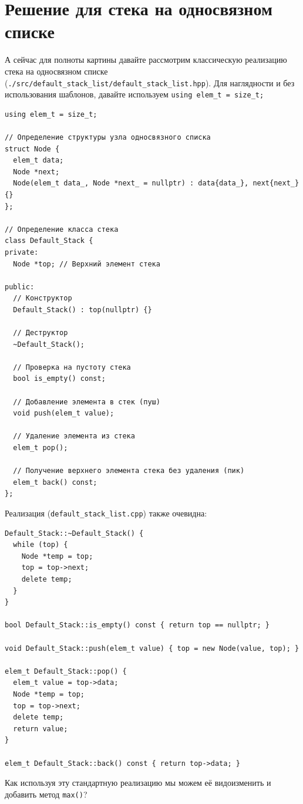 \section{Решение для стека на односвязном списке}

А сейчас для полноты картины давайте рассмотрим классическую реализацию стека на односвязном списке (\texttt{./src/default_stack_list/default_stack_list.hpp}). Для наглядности и без использования шаблонов, давайте используем \verb|using elem_t = size_t;| 
\begin{verbatim}
using elem_t = size_t;

// Определение структуры узла односвязного списка
struct Node {
  elem_t data;
  Node *next;
  Node(elem_t data_, Node *next_ = nullptr) : data{data_}, next{next_} {}
};

// Определение класса стека
class Default_Stack {
private:
  Node *top; // Верхний элемент стека

public:
  // Конструктор
  Default_Stack() : top(nullptr) {}

  // Деструктор
  ~Default_Stack();

  // Проверка на пустоту стека
  bool is_empty() const;

  // Добавление элемента в стек (пуш)
  void push(elem_t value);

  // Удаление элемента из стека
  elem_t pop();

  // Получение верхнего элемента стека без удаления (пик)
  elem_t back() const;
};
\end{verbatim}

Реализация (\verb|default_stack_list.cpp|) также очевидна:
\begin{verbatim}
Default_Stack::~Default_Stack() {
  while (top) {
    Node *temp = top;
    top = top->next;
    delete temp;
  }
}
  
bool Default_Stack::is_empty() const { return top == nullptr; }

void Default_Stack::push(elem_t value) { top = new Node(value, top); }

elem_t Default_Stack::pop() {
  elem_t value = top->data;
  Node *temp = top;
  top = top->next;
  delete temp;
  return value;
}

elem_t Default_Stack::back() const { return top->data; }
\end{verbatim}

Как используя эту стандартную реализацию мы можем её видоизменить и добавить метод \texttt{max()}?


